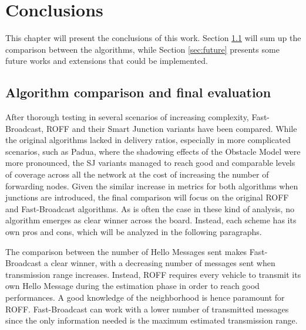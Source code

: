 

\chapter{Conclusions}
	This chapter will present the conclusions of this work. Section \ref{sec:comparison} will sum up the comparison between the algorithms, while Section \ref{sec:future} presents some future works and extensions that could be implemented.
	\section{Algorithm comparison and final evaluation}
		\label{sec:comparison}
		After thorough testing in several scenarios of increasing complexity, Fast-Broadcast, ROFF and their Smart Junction variants have been compared. While the original algorithms lacked in delivery ratios, especially in more complicated scenarios, such as Padua, where the shadowing effects of the Obstacle Model were more pronounced, the SJ variants managed to reach good and comparable levels of coverage across all the network at the cost of increasing the number of forwarding nodes. Given the similar increase in metrics for both algorithms when junctions are introduced, the final comparison will focus on the original ROFF and Fast-Broadcast algorithms. As is often the case in these kind of analysis, no algorithm emerges as clear winner across the board. Instead, each scheme has its own pros and cons, which will be analyzed in the following paragraphs.
		
		
		The comparison between the number of Hello Messages sent makes Fast-Broadcast a clear winner, with a decreasing number of messages sent when transmission range increases. Instead, ROFF requires every vehicle to transmit its own Hello Message during the estimation phase in order to reach good performances. A good knowledge of the neighborhood is hence paramount for ROFF. Fast-Broadcast can work with a lower number of transmitted messages since the only information needed is the maximum estimated transmission range. 
		
